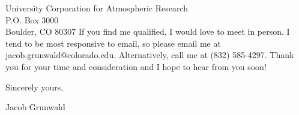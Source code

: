 \documentclass[11pt]{letter} %
\begin{document}
\begin{letter}{
University Corporation for Atmospheric Research \\
P.O. Box 3000 \\
Boulder, CO 80307}
If you find me qualified, I would love to meet in person. I tend to be most responsive to email, so please email me at jacob.grunwald@colorado.edu. Alternatively, call me at (832) 585-4297. Thank you for your time and consideration and I hope to hear from you soon!

Sincerely yours,

Jacob Grunwald


\end{letter}
\end{document}
